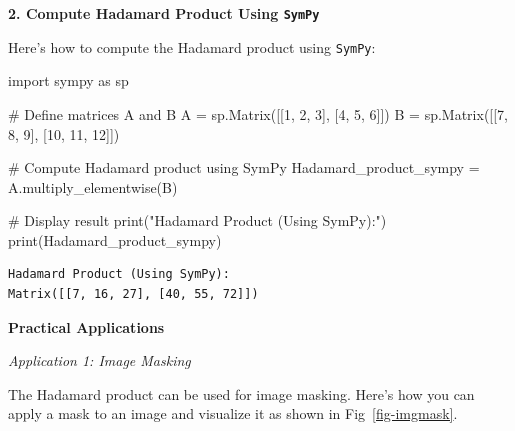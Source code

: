 \documentclass[
  letterpaper,
  DIV=11,
  numbers=noendperiod]{scrreprt}
\newenvironment{Shaded}{\begin{snugshade}}{\end{snugshade}}
\newcommand{\BuiltInTok}[1]{\textcolor[rgb]{0.00,0.23,0.31}{#1}}
\newcommand{\CommentTok}[1]{\textcolor[rgb]{0.37,0.37,0.37}{#1}}
\newcommand{\DecValTok}[1]{\textcolor[rgb]{0.68,0.00,0.00}{#1}}
\newcommand{\ImportTok}[1]{\textcolor[rgb]{0.00,0.46,0.62}{#1}}
\newcommand{\NormalTok}[1]{\textcolor[rgb]{0.00,0.23,0.31}{#1}}
\newcommand{\OperatorTok}[1]{\textcolor[rgb]{0.37,0.37,0.37}{#1}}
\newcommand{\StringTok}[1]{\textcolor[rgb]{0.13,0.47,0.30}{#1}}
\theoremstyle{plain}
\theoremstyle{definition}
\theoremstyle{remark}
\begin{document}
\textbf{2. Compute Hadamard Product Using \texttt{SymPy}}

Here's how to compute the Hadamard product using \texttt{SymPy}:

\begin{Shaded}
\begin{Highlighting}[]
\ImportTok{import}\NormalTok{ sympy }\ImportTok{as}\NormalTok{ sp}

\CommentTok{\# Define matrices A and B}
\NormalTok{A }\OperatorTok{=}\NormalTok{ sp.Matrix([[}\DecValTok{1}\NormalTok{, }\DecValTok{2}\NormalTok{, }\DecValTok{3}\NormalTok{], [}\DecValTok{4}\NormalTok{, }\DecValTok{5}\NormalTok{, }\DecValTok{6}\NormalTok{]])}
\NormalTok{B }\OperatorTok{=}\NormalTok{ sp.Matrix([[}\DecValTok{7}\NormalTok{, }\DecValTok{8}\NormalTok{, }\DecValTok{9}\NormalTok{], [}\DecValTok{10}\NormalTok{, }\DecValTok{11}\NormalTok{, }\DecValTok{12}\NormalTok{]])}

\CommentTok{\# Compute Hadamard product using SymPy}
\NormalTok{Hadamard\_product\_sympy }\OperatorTok{=}\NormalTok{ A.multiply\_elementwise(B)}

\CommentTok{\# Display result}
\BuiltInTok{print}\NormalTok{(}\StringTok{"Hadamard Product (Using SymPy):"}\NormalTok{)}
\BuiltInTok{print}\NormalTok{(Hadamard\_product\_sympy)}
\end{Highlighting}
\end{Shaded}

\begin{verbatim}
Hadamard Product (Using SymPy):
Matrix([[7, 16, 27], [40, 55, 72]])
\end{verbatim}

\textbf{Practical Applications}

\emph{Application 1: Image Masking}

The Hadamard product can be used for image masking. Here's how you can
apply a mask to an image and visualize it as shown in
Fig~\ref{fig-imgmask}.
\end{document}
